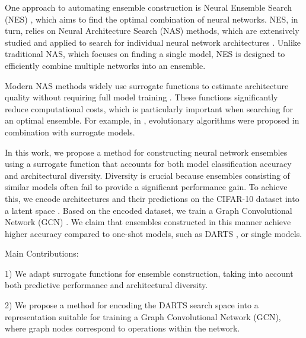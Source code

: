 \documentclass[USenglish]{article}
\theoremstyle{dgthm}
\begin{document}
One approach to automating ensemble construction is Neural Ensemble Search (NES) \cite{Zaidi2021}, which aims to find the optimal combination of neural networks. NES, in turn, relies on Neural Architecture Search (NAS) methods, which are extensively studied and applied to search for individual neural network architectures \cite{Zoph2017, Baeck2018, Liu2023}. Unlike traditional NAS, which focuses on finding a single model, NES is designed to efficiently combine multiple networks into an ensemble.

Modern NAS methods widely use surrogate functions to estimate architecture quality without requiring full model training \cite{Lu2022, Lu2020}. These functions significantly reduce computational costs, which is particularly important when searching for an optimal ensemble. For example, in \cite{Lu2022}, evolutionary algorithms were proposed in combination with surrogate models.

In this work, we propose a method for constructing neural network ensembles using a surrogate function that accounts for both model classification accuracy and architectural diversity. Diversity is crucial because ensembles consisting of similar models often fail to provide a significant performance gain. To achieve this, we encode architectures and their predictions on the CIFAR-10 dataset into a latent space \cite{S_Xue_2024}. Based on the encoded dataset, we train a Graph Convolutional Network (GCN) \cite{Kipf2017}. We claim that ensembles constructed in this manner achieve higher accuracy compared to one-shot models, such as DARTS \cite{Liu2018}, or single models.

Main Contributions:

1) We adapt surrogate functions for ensemble construction, taking into account both predictive performance and architectural diversity.

2) We propose a method for encoding the DARTS search space into a representation suitable for training a Graph Convolutional Network (GCN), where graph nodes correspond to operations within the network.




\end{document}
